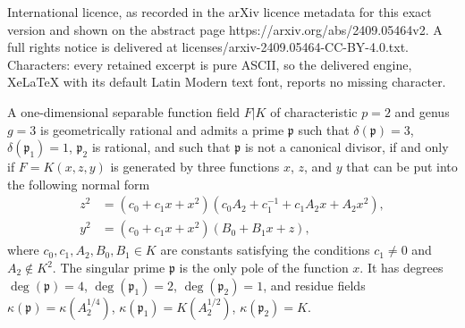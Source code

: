 \documentclass[10pt,a4paper]{amsart}
\newcommand{\de}{\delta}
\newcommand{\ka}{\kappa}
\newcommand{\pp}{\mathfrak{p}}
\begin{document}
International licence, as recorded in the arXiv licence metadata for this exact version and shown on the abstract page https://arxiv.org/abs/2409.05464v2. A full rights notice is delivered at licenses/arxiv-2409.05464-CC-BY-4.0.txt. Characters: every retained excerpt is pure ASCII, so the delivered engine, XeLaTeX with its default Latin Modern text font, reports no missing character.
\begin{thm}\label{2024_02_18_00:35}
A one-dimensional separable function field $F|K$ of characteristic $p=2$ and genus $g = 3$ is geometrically rational and admits a prime $\pp$ such that $\de(\pp) = 3$, $\de(\pp_1) = 1$, $\pp_2$ is rational, and such that $\pp$ is not a canonical divisor, if and only if 
$F=K(x,z,y)$ is generated by three functions $x$, $z$, and $y$ that can be put into the following normal form
\begin{align*}
z^2 &= (c_0 + c_1 x + x^2) (c_0 A_2 + c_1^{-1} + c_1 A_2 x + A_2 x^2), \\
y^2 &= (c_0 + c_1 x + x^2) (B_0 + B_1 x + z),
\end{align*}
where $c_0,c_1,A_2,B_0,B_1\in K$ are constants satisfying the conditions $c_1\neq 0$ and $A_2\notin K^2$.
The singular prime $\pp$ is the only pole of the function $x$.
It has 
degrees $\deg(\pp)=4$, $\deg(\pp_1)=2$, $\deg(\pp_2)=1$, and
residue fields $\ka(\pp)=\ka(A_2^{1/4})$, $\ka(\pp_1)=K(A_2^{1/2})$, $\ka(\pp_2)=K$.
\end{thm}
\end{document}
